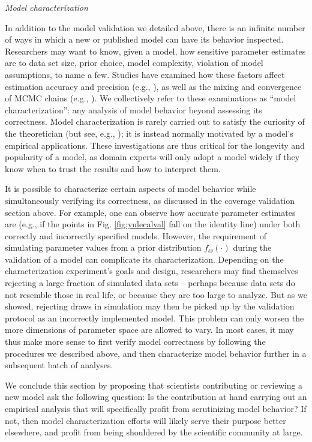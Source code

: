 \documentclass[oneside]{article}
\begin{document}
\vspace{.25cm}

\noindent \emph{Model characterization}

In addition to the model validation we detailed above, there is an infinite number of ways in which a new or published model can have its behavior inspected.
Researchers may want to know, given a model, how sensitive parameter estimates are to data set size, prior choice, model complexity, violation of model assumptions, to name a few.
Studies have examined how these factors affect estimation accuracy and precision (e.g., \citealp{zhang24,luo23}), as well as the mixing and convergence of MCMC chains (e.g., \citealp{nylander04,zhang24}).
We collectively refer to these examinations as ``model characterization'': any analysis of model behavior beyond assessing its correctness.
Model characterization is rarely carried out to satisfy the curiosity of the theoretician (but see, e.g., \citealp{tuffley97,steel20}); it is instead normally motivated by a model's empirical applications.
These investigations are thus critical for the longevity and popularity of a model, as domain experts will only adopt a model widely if they know when to trust the results and how to interpret them.

It is possible to characterize certain aspects of model behavior while simultaneously verifying its correctness, as discussed in the coverage validation section above.
For example, one can observe how accurate parameter estimates are (e.g., if the points in Fig. \ref{fig:yulecalval} fall on the identity line) under both correctly and incorrectly specified models.
However, the requirement of simulating parameter values from a prior distribution $f_{\Theta}(\cdot)$ during the validation of a model can complicate its characterization.
Depending on the characterization experiment's goals and design, researchers may find themselves rejecting a large fraction of simulated data sets -- perhaps because data sets do not resemble those in real life, or because they are too large to analyze.
But as we showed, rejecting draws in simulation may then be picked up by the validation protocol as an incorrectly implemented model.
This problem can only worsen the more dimensions of parameter space are allowed to vary.
In most cases, it may thus make more sense to first verify model correctness by following the procedures we described above, and then characterize model behavior further in a subsequent batch of analyses.

We conclude this section by proposing that scientists contributing or reviewing a new model ask the following question: Is the contribution at hand carrying out an empirical analysis that will specifically profit from scrutinizing model behavior?
If not, then model characterization efforts will likely serve their purpose better elsewhere, and profit from being shouldered by the scientific community at large.
\end{document}
